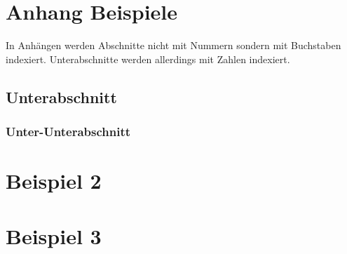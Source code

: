 \newpage
\begin{appendices}
\clearpage
{}

\section{Anhang Beispiele}
In Anhängen werden Abschnitte nicht mit Nummern sondern mit Buchstaben
indexiert. Unterabschnitte werden allerdings mit Zahlen indexiert.

\subsection{Unterabschnitt}
\lipsum[4]

\subsubsection{Unter-Unterabschnitt}
\lipsum[4]

\section{Beispiel 2}
\lipsum[4]

\section{Beispiel 3}
\lipsum[4]

\end{appendices}
